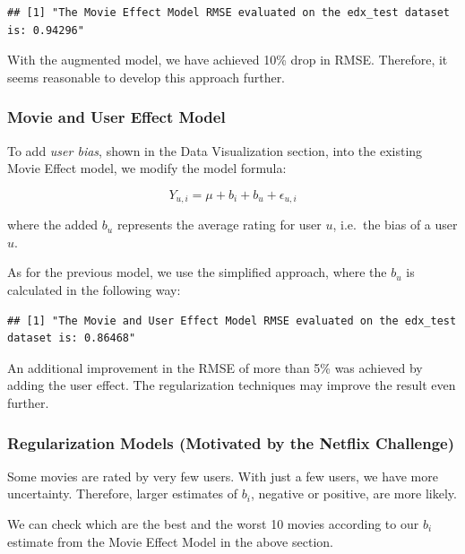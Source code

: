 \documentclass[
]{article}
\begin{document}
\begin{verbatim}
## [1] "The Movie Effect Model RMSE evaluated on the edx_test dataset is: 0.94296"
\end{verbatim}

With the augmented model, we have achieved 10\% drop in RMSE. Therefore,
it seems reasonable to develop this approach further.

\hypertarget{movie-and-user-effect-model}{%
\subsubsection{Movie and User Effect
Model}\label{movie-and-user-effect-model}}

To add \emph{user bias}, shown in the Data Visualization section, into
the existing Movie Effect model, we modify the model formula:

\[Y_{u,i} = \mu + b_i + b_u + \epsilon_{u,i}\]

where the added \(b_u\) represents the average rating for user \(u\),
i.e.~the bias of a user \(u\).

As for the previous model, we use the simplified approach, where the
\(b_u\) is calculated in the following way:

\begin{verbatim}
## [1] "The Movie and User Effect Model RMSE evaluated on the edx_test dataset is: 0.86468"
\end{verbatim}

An additional improvement in the RMSE of more than 5\% was achieved by
adding the user effect. The regularization techniques may improve the
result even further.

\hypertarget{regularization-models-motivated-by-the-netflix-challenge}{%
\subsubsection{Regularization Models (Motivated by the Netflix
Challenge)}\label{regularization-models-motivated-by-the-netflix-challenge}}

Some movies are rated by very few users. With just a few users, we have
more uncertainty. Therefore, larger estimates of \(b_i\), negative or
positive, are more likely.

We can check which are the best and the worst 10 movies according to our
\(b_i\) estimate from the Movie Effect Model in the above section.
\end{document}

